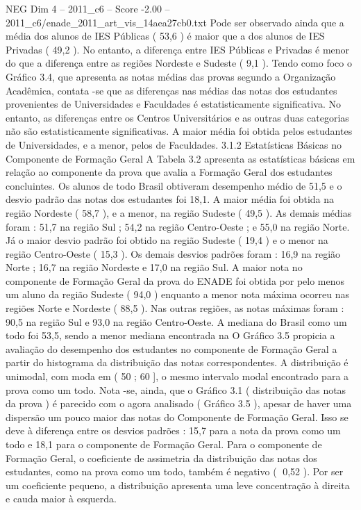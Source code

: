 \begin{textsample}{NEG Dim 4 – 2011\_c6 – Score -2.00 – 2011\_c6/enade\_2011\_art\_vis\_14aea27cb0.txt}
Pode ser observado ainda que a média dos alunos de IES Públicas ( 53,6 ) é maior que a dos alunos de IES Privadas ( 49,2 ).
No entanto, a diferença entre IES Públicas e Privadas é menor do que a diferença entre as regiões Nordeste e Sudeste ( 9,1 ).
Tendo como foco o Gráfico 3.4, que apresenta as notas médias das provas segundo a Organização Acadêmica, contata -se que as diferenças nas médias das notas dos estudantes provenientes de Universidades e Faculdades é estatisticamente significativa.
No entanto, as diferenças entre os Centros Universitários e as outras duas categorias não são estatisticamente significativas.
A maior média foi obtida pelos estudantes de Universidades, e a menor, pelos de Faculdades. 3.1.2 Estatísticas Básicas no Componente de Formação Geral A Tabela 3.2 apresenta as estatísticas básicas em relação ao componente da prova que avalia a Formação Geral dos estudantes concluintes.
Os alunos de todo Brasil obtiveram desempenho médio de 51,5 e o desvio padrão das notas dos estudantes foi 18,1.
A maior média foi obtida na região Nordeste ( 58,7 ), e a menor, na região Sudeste ( 49,5 ).
As demais médias foram : 51,7 na região Sul ; 54,2 na região Centro-Oeste ; e 55,0 na região Norte.
Já o maior desvio padrão foi obtido na região Sudeste ( 19,4 ) e o menor na região Centro-Oeste ( 15,3 ).
Os demais desvios padrões foram : 16,9 na região Norte ; 16,7 na região Nordeste e 17,0 na região Sul.
A maior nota no componente de Formação Geral da prova do ENADE foi obtida por pelo menos um aluno da região Sudeste ( 94,0 ) enquanto a menor nota máxima ocorreu nas regiões Norte e Nordeste ( 88,5 ).
Nas outras regiões, as notas máximas foram : 90,5 na região Sul e 93,0 na região Centro-Oeste.
A mediana do Brasil como um todo foi 53,5, sendo a menor mediana encontrada na O Gráfico 3.5 propicia a avaliação do desempenho dos estudantes no componente de Formação Geral a partir do histograma da distribuição das notas correspondentes.
A distribuição é unimodal, com moda em ( 50 ; 60 ], o mesmo intervalo modal encontrado para a prova como um todo.
Nota -se, ainda, que o Gráfico 3.1 ( distribuição das notas da prova ) é parecido com o agora analisado ( Gráfico 3.5 ), apesar de haver uma dispersão um pouco maior das notas do Componente de Formação Geral.
Isso se deve à diferença entre os desvios padrões : 15,7 para a nota da prova como um todo e 18,1 para o componente de Formação Geral.
Para o componente de Formação Geral, o coeficiente de assimetria da distribuição das notas dos estudantes, como na prova como um todo, também é negativo ( 0,52 ).
Por ser um coeficiente pequeno, a distribuição apresenta uma leve concentração à direita e cauda maior à esquerda.

\end{textsample}
